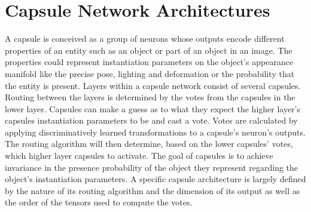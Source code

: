 \chapter{Capsule Network Architectures}\label{chapter:capsules}
A capsule is conceived as a group of neurons whose outputs encode different properties of an entity such as an object or part of an object in an image. The properties could represent instantiation parameters on the object's appearance manifold like the precise pose, lighting and deformation or the probability that the entity is present. Layers within a capsule network consist of several capsules. Routing between the layers is determined by the votes from the capsules in the lower layer. Capsules can make a guess as to what they expect the higher layer's capsules instantiation parameters to be and cast a vote. Votes are calculated by applying discriminatively learned transformations to a capsule's neuron's outputs. The routing algorithm will then determine, based on the lower capsules' votes, which higher layer capsules to activate. The goal of capsules is to achieve invariance in the presence probability of the object they represent regarding the object's instantiation parameters. A specific capsule architecture is largely defined by the nature of its routing algorithm and the dimension of its output as well as the order of the tensors used to compute the votes.

